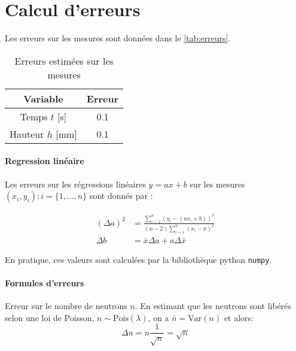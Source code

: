 \section{Calcul d'erreurs}
\label{sec:erreurs}

Les erreurs sur les mesures sont données dans le \autoref{tab:erreurs}.

\begin{table}[h]
    \centering
    \begin{tabulary}{\textwidth}{C C}
        \toprule
        Variable & Erreur \\
        \midrule
        Temps \(t\) [s] & 0.1 \\
        Hauteur \(h\) [mm] & 0.1 \\
        \bottomrule
    \end{tabulary}
    \caption{Erreurs estimées sur les mesures}
    \label{tab:erreurs}
\end{table}

\paragraph*{Regression linéaire}
Les erreurs sur les régressions linéaires \(y = ax + b\) sur les mesures \((x_i, y_i) ; i = \{1, \dots, n\}\) sont donnés par \cite{erreursmesure}:

\begin{equation}
    \label{eq:erreur:fit}
    \begin{aligned}
        (\Delta a)^2 &= \frac{\sum_{i=1}^{n}(y_i - (a x_i + b))^2}{(n-2) \sum_{i=1}^{n}(x_i - \bar{x})^2}\\
        \Delta b &= \bar{x} \Delta a + a \Delta \bar{x}
    \end{aligned}
\end{equation}

En pratique, ces valeurs sont calculées par la bibliothèque python \texttt{numpy}.

\paragraph*{Formules d'erreurs}

Erreur sur le nombre de neutrons \(n\). En estimant que les neutrons sont libérés selon une loi de Poisson, \(n \sim \textrm{Pois}(\lambda)\), on a \(\bar n = \textrm{Var}(n)\) et alors:
\begin{equation}
    \Delta n = n \frac{1}{\sqrt{n}} = \sqrt{n}
\end{equation}


